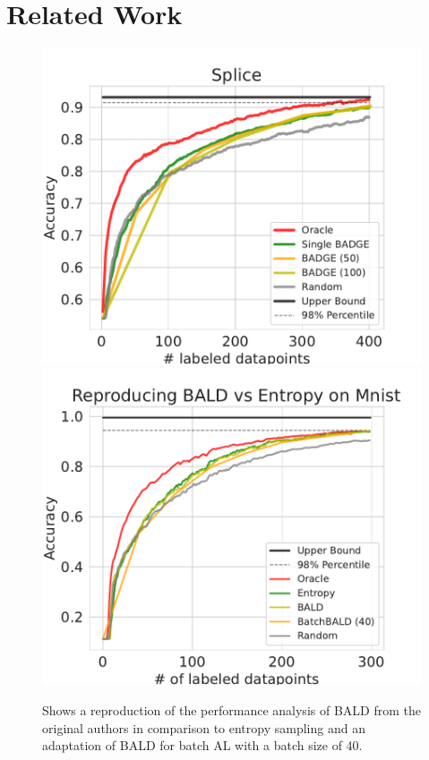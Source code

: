 \documentclass[]{article}
\begin{document}
\section{Related Work}
\begin{figure}
	\centering
	\includegraphics[width=0.49\linewidth]{img/ablation_splice_bald}
	\includegraphics[width=0.49\linewidth]{img/ablation_bald}
	\caption{Shows a reproduction of the performance analysis of BALD from the original authors \cite{gal2017deep} in comparison to entropy sampling and an adaptation of BALD for batch AL \cite{kirsch2019batchbald} with a batch size of 40.}
	\label{fig:ablation_bald}
\end{figure}
\end{document}
